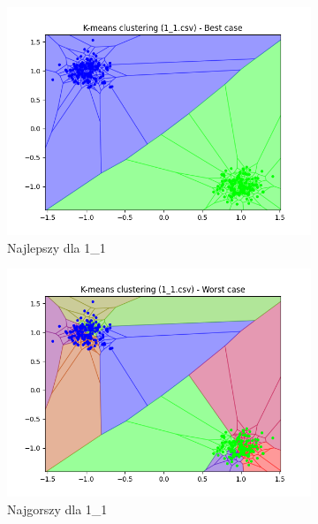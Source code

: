 \documentclass[12pt]{article}
\begin{document}
\begin{figure}[H]
    \centering
    \begin{subfigure}[b]{0.24\textwidth}
        \includegraphics[width=\linewidth]{img/exp_2/kmeans/1_1_best.png}
        \caption{Najlepszy dla 1\_1}
    \end{subfigure}
    \hfill
    \begin{subfigure}[b]{0.24\textwidth}
        \includegraphics[width=\linewidth]{img/exp_2/kmeans/1_1_worst.png}
        \caption{Najgorszy dla 1\_1}
    \end{subfigure}
    \hfill
    \begin{subfigure}[b]{0.24\textwidth}

\end{subfigure}
\end{figure}
\end{document}
